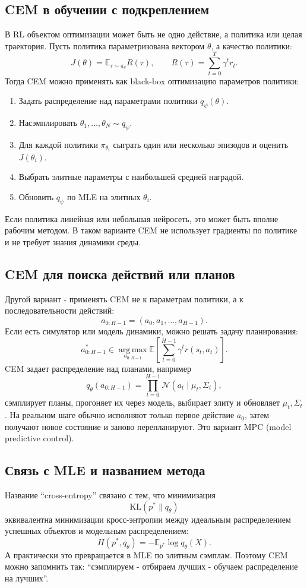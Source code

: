 \documentclass[11pt,a4paper]{article}
\newcommand{\E}{\mathbb{E}}
\newcommand{\KL}{\mathrm{KL}}
\newcommand{\argmax}{\operatorname*{arg\,max}}
\newcommand{\1}{\mathbf{1}}
\begin{document}
\subsection*{CEM в обучении с подкреплением}
В RL объектом оптимизации может быть не одно действие, а политика или целая траектория. Пусть политика параметризована вектором $\theta$, а качество политики:
\[
    J(\theta)=\E_{\tau\sim\pi_\theta}R(\tau),
    \qquad
    R(\tau)=\sum_{t=0}^{T}\gamma^t r_t.
\]
Тогда CEM можно применять как black-box оптимизацию параметров политики:
\begin{enumerate}
    \item Задать распределение над параметрами политики $q_\psi(\theta)$.
    \item Насэмплировать $\theta_1,\dots,\theta_N\sim q_\psi$.
    \item Для каждой политики $\pi_{\theta_i}$ сыграть один или несколько эпизодов и оценить $J(\theta_i)$.
    \item Выбрать элитные параметры с наибольшей средней наградой.
    \item Обновить $q_\psi$ по MLE на элитных $\theta_i$.
\end{enumerate}

Если политика линейная или небольшая нейросеть, это может быть вполне рабочим методом. В таком варианте CEM не использует градиенты по политике и не требует знания динамики среды.

\subsection*{CEM для поиска действий или планов}
Другой вариант - применять CEM не к параметрам политики, а к последовательности действий:
\[
    a_{0:H-1}=(a_0,a_1,\dots,a_{H-1}).
\]
Если есть симулятор или модель динамики, можно решать задачу планирования:
\[
    a_{0:H-1}^*\in \argmax_{a_{0:H-1}}\E\left[\sum_{t=0}^{H-1}\gamma^t r(s_t,a_t)\right].
\]
CEM задает распределение над планами, например
\[
    q_\theta(a_{0:H-1}) = \prod_{t=0}^{H-1}\mathcal N(a_t\mid \mu_t,\Sigma_t),
\]
сэмплирует планы, прогоняет их через модель, выбирает элиту и обновляет $\mu_t,\Sigma_t$. На реальном шаге обычно исполняют только первое действие $a_0$, затем получают новое состояние и заново перепланируют. Это вариант MPC (model predictive control).

\subsection*{Связь с MLE и названием метода}
Название ``cross-entropy'' связано с тем, что минимизация
\[
    \KL(p^*\|q_\theta)
\]
эквивалентна минимизации кросс-энтропии между идеальным распределением успешных объектов и модельным распределением:
\[
    H(p^*,q_\theta)=-\E_{p^*}\log q_\theta(X).
\]
А практически это превращается в MLE по элитным сэмплам. Поэтому CEM можно запомнить так: ``сэмплируем - отбираем лучших - обучаем распределение на лучших''.
\end{document}
